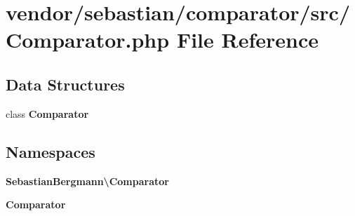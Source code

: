 \section{vendor/sebastian/comparator/src/\+Comparator.php File Reference}
\label{sebastian_2comparator_2src_2_comparator_8php}
\subsection*{Data Structures}
\begin{DoxyCompactItemize}
\item 
class {\bf Comparator}
\end{DoxyCompactItemize}
\subsection*{Namespaces}
\begin{DoxyCompactItemize}
\item 
 {\bf Sebastian\+Bergmann\textbackslash{}\+Comparator}
\item 
 {\bf Comparator}
\end{DoxyCompactItemize}
